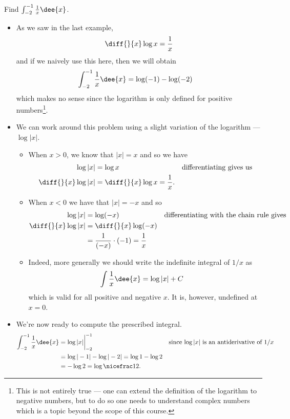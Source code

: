 \begin{eg}\label{eg:INTintegralD}
Find $\int_{-2}^{-1} \frac{1}{x}\dee{x}$.

\soln
\begin{itemize}
 \item As we saw in the last example,
\begin{align*}
\diff{}{x}\log x = \frac{1}{x}
\end{align*}
and if we naively use this here, then we will obtain
\begin{align*}
  \int_{-2}^{-1} \frac{1}{x}\dee{x} &= \log(-1)-\log(-2)
\end{align*}
which makes no sense since the logarithm is only defined for positive
numbers\footnote{This is not entirely true --- one can extend the definition of the
logarithm to negative numbers, but to do so one needs to understand complex numbers
which is a topic beyond the scope of this course.}.

\item We can work around this problem using a slight variation of the logarithm ---
$\log|x|$.
\begin{itemize}
 \item When $x>0$, we know that $|x|=x$ and so we have
\begin{align*}
  \log |x| &= \log x & \text{differentiating gives us}\\
  \diff{}{x}\log|x| &= \diff{}{x} \log x = \frac{1}{x}.
\end{align*}
\item When $x<0$ we have that $|x|=-x$ and so
\begin{align*}
  \log |x| &= \log(-x) & \text{differentiating with the chain rule gives}\\
  \diff{}{x}\log|x| &= \diff{}{x} \log(-x) \\
  &= \frac{1}{(-x)} \cdot (-1) = \frac{1}{x}
\end{align*}
\item Indeed, more generally we should write the indefinite integral of $1/x$ as
\begin{align*}
  \int \frac{1}{x} \dee{x} &= \log |x| + C
\end{align*}
which is valid for all positive and negative $x$. It is, however, undefined at $x=0$.
\end{itemize}
\item We're now ready to compute the prescribed integral.
\begin{align*}
\int_{-2}^{-1} \frac{1}{x}\dee{x}
&= \log|x| \bigg|_{-2}^{-1}
& \text{since $\log|x|$ is an antiderivative of $1/x$}\\
&= \log|-1| - \log|-2| = \log 1-\log 2\\
&= -\log 2 = \log\nicefrac12.
\end{align*}

\end{itemize}
\end{eg}


